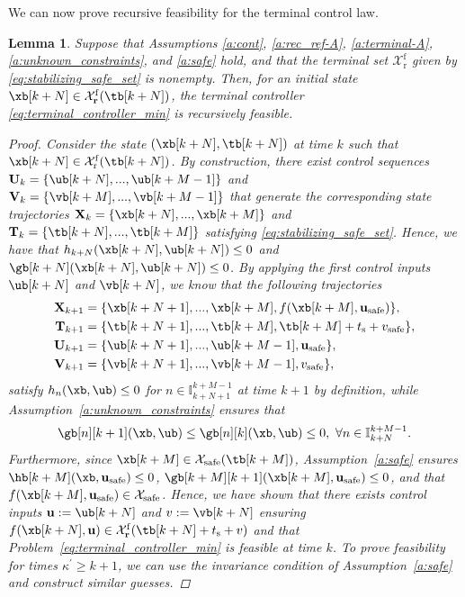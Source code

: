 \documentclass[journal]{IEEEtran}
\renewcommand{\u}{{\mathbf{u}}}
\newcommand{\vv}{{{v}}}
\renewcommand{\r}{{\mathbf{r}}}
\newtheorem{Lemma}{Lemma}
\begin{document}
	We can now prove recursive feasibility for the terminal control law.
	\begin{Lemma}\label{lemma:1}
		Suppose that Assumptions \ref{a:cont}, \ref{a:rec_ref-A}, \ref{a:terminal-A}, \ref{a:unknown_constraints}, and \ref{a:safe} hold, and that the terminal set $\mathcal{X}_\mathrm{r}^\mathrm{f}$ given by \eqref{eq:stabilizing_safe_set} is nonempty. Then, for an initial state $\xb[k+N]\in\mathcal{X}_\r^\mathrm{f}(\tb[k+N])$, the terminal controller \eqref{eq:terminal_controller_min} is recursively feasible.
		
		\begin{proof}
			Consider the state $(\xb[k+N],\tb[k+N])$ at time $k$ such that $\xb[k+N]\in\mathcal{X}_\mathrm{r}^\mathrm{f}(\tb[k+N])$. By construction, there exist control sequences $\mathbf{U}_k=\{\ub[k+N],...,\ub[k+M-1]\}$ and $\mathbf{V}_k=\{\vb[k+M],...,\vb[k+M-1]\}$ that generate the corresponding state trajectories $\mathbf{X}_k=\{\xb[k+N],...,\xb[k+M]\}$ and $\mathbf{T}_k=\{\tb[k+N],...,\tb[k+M]\}$ satisfying \eqref{eq:stabilizing_safe_set}. Hence, we have that $h_{k+N}(\xb[k+N],\ub[k+N])\leq{}0$ and $\gb[k+N](\xb[k+N],\ub[k+N])\leq{}0$. By applying the first control inputs $\ub[k+N]$ and $\vb[k+N]$, we know that 
			the following trajectories
			\begin{align}
			\mathbf{X}_{k+1} &= \{\xb[k+N+1],...,\xb[k+M],f(\xb[k+M],\u_\mathrm{safe}) \},\\
			\mathbf{T}_{k+1} &= \{\tb[k+N+1],...,\tb[k+M], \tb[k+M] + t_\mathrm{s} + v_\mathrm{safe} \},\\
			\mathbf{U}_{k+1} &= \{\ub[k+N+1],...,\ub[k+M-1],\u_\mathrm{safe} \},\\
			\mathbf{V}_{k+1} &= \{\vb[k+N+1],...,\vb[k+M-1],\vv_\mathrm{safe} \},
			\end{align}
			satisfy $h_n(\xb,\ub)\leq{}0$ for $n\in\mathbb{I}_{k+N+1}^{k+M-1}$ at time $k+1$ by definition, while Assumption~\ref{a:unknown_constraints} ensures that
				$$\gb[n][k+1](\xb,\ub)\leq{}\gb[n][k](\xb,\ub)\leq{}0,\ \forall n\in\mathbb{I}_{k+N}^{k+M-1}.$$
			Furthermore, since $\xb[k+M]\in\mathcal{X}_\mathrm{safe}(\tb[k+M])$, Assumption~\ref{a:safe} ensures $\hb[k+M](\xb,\u_\mathrm{safe})\leq{}0$, $\gb[k+M][k+1](\xb[k+M],\u_\mathrm{safe})\leq{}0$, and that $f(\xb[k+M],\u_\mathrm{safe})\in\mathcal{X}_\mathrm{safe}$. Hence, we have shown that there exists control inputs $\u:=\ub[k+N]$ and $v:=\vb[k+N]$ ensuring $f(\xb[k+N],\u)\in\mathcal{X}_\r^\mathrm{f}(\tb[k+N]+t_\mathrm{s}+v)$ and that Problem~\eqref{eq:terminal_controller_min} is feasible at time $k$. To prove feasibility for times $\kappa^\prime\geq{}k+1$, we can use the invariance condition of Assumption~\ref{a:safe} and construct similar guesses.
		\end{proof}	
	\end{Lemma}
\end{document}
